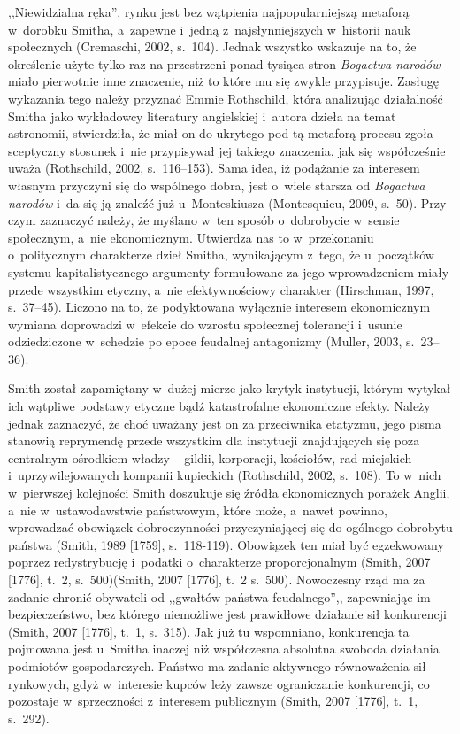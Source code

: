,,Niewidzialna ręka'', rynku jest bez wątpienia najpopularniejszą metaforą w~dorobku Smitha, a~zapewne i~jedną z~najsłynniejszych w~historii nauk społecznych \label{ref:RND56kR0uPFkj}(Cremaschi, 2002, s.~104). Jednak wszystko wskazuje na to, że określenie użyte tylko raz na przestrzeni ponad tysiąca stron \textit{Bogactwa narodów} miało pierwotnie inne znaczenie, niż to które mu się zwykle przypisuje. Zasługę wykazania tego należy przyznać Emmie Rothschild, która analizując działalność Smitha jako wykładowcy literatury angielskiej i~autora dzieła na temat astronomii, stwierdziła, że miał on do ukrytego pod tą metaforą procesu zgoła sceptyczny stosunek i~nie przypisywał jej takiego znaczenia, jak się współcześnie uważa \label{ref:RNDX0KZpqEQRj}(Rothschild, 2002, s.~116–153). Sama idea, iż podążanie za interesem własnym przyczyni się do wspólnego dobra, jest o~wiele starsza od \textit{Bogactwa narodów} i~da się ją znaleźć już u~Monteskiusza \label{ref:RNDStjVF4fTz2}(Montesquieu, 2009, s.~50). Przy czym zaznaczyć należy, że myślano w~ten sposób o~dobrobycie w~sensie społecznym, a~nie ekonomicznym. Utwierdza nas to w~przekonaniu o~politycznym charakterze dzieł Smitha, wynikającym z~tego, że u~początków systemu kapitalistycznego argumenty formułowane za jego wprowadzeniem miały przede wszystkim etyczny, a~nie efektywnościowy charakter \label{ref:RNDkxQbrekKjf}(Hirschman, 1997, s.~37–45). Liczono na to, że podyktowana wyłącznie interesem ekonomicznym wymiana doprowadzi w~efekcie do wzrostu społecznej tolerancji i~usunie odziedziczone w~schedzie po epoce feudalnej antagonizmy \label{ref:RNDYmmEjf3eVb}(Muller, 2003, s.~23–36).

Smith został zapamiętany w~dużej mierze jako krytyk instytucji, którym wytykał ich wątpliwe podstawy etyczne bądź katastrofalne ekonomiczne efekty. Należy jednak zaznaczyć, że choć uważany jest on za przeciwnika etatyzmu, jego pisma stanowią reprymendę przede wszystkim dla instytucji znajdujących się poza centralnym ośrodkiem władzy -- gildii, korporacji, kościołów, rad miejskich i~uprzywilejowanych kompanii kupieckich \label{ref:RNDTxyZWr558R}(Rothschild, 2002, s.~108). To w~nich w~pierwszej kolejności Smith doszukuje się źródła ekonomicznych porażek Anglii, a~nie w~ustawodawstwie państwowym, które może, a~nawet powinno, wprowadzać obowiązek dobroczynności przyczyniającej się do ogólnego dobrobytu państwa \label{ref:RNDW6eBaQF4K0}(Smith, 1989 [1759], s.~118-119). Obowiązek ten miał być egzekwowany poprzez redystrybucję i~podatki o~charakterze proporcjonalnym \label{ref:RNDpQhGODGDa8}(Smith, 2007 [1776], t.~2, s.~500)(Smith, 2007 [1776], t.~2 s.~500). Nowoczesny rząd ma za zadanie chronić obywateli od ,,gwałtów państwa feudalnego'',, zapewniając im bezpieczeństwo, bez którego niemożliwe jest prawidłowe działanie sił konkurencji \label{ref:RNDWm3VFowt3n}(Smith, 2007 [1776], t.~1, s.~315). Jak już tu wspomniano, konkurencja ta pojmowana jest u~Smitha inaczej niż współczesna absolutna swoboda działania podmiotów gospodarczych. Państwo ma zadanie aktywnego równoważenia sił rynkowych, gdyż w~interesie kupców leży zawsze ograniczanie konkurencji, co pozostaje w~sprzeczności z~interesem publicznym \label{ref:RND2jnRYZ0Sx9}(Smith, 2007 [1776], t.~1, s.~292).

